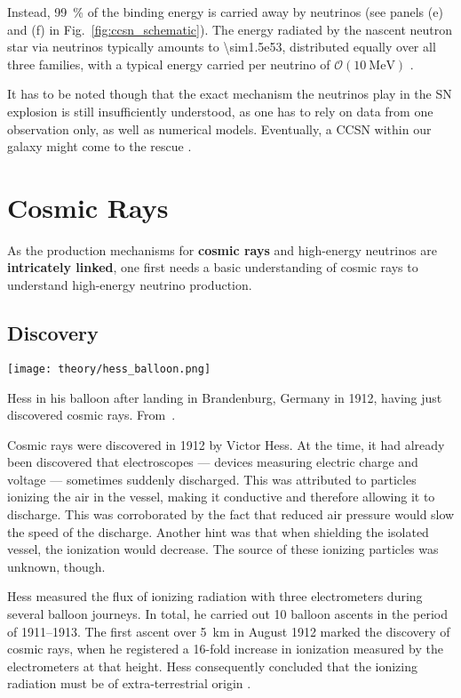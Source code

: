 Instead, \SI{99}{\percent} of the binding energy is carried away by neutrinos (see panels (e) and (f) in Fig.~\ref{fig:ccsn_schematic}). The energy radiated by the nascent neutron star via neutrinos typically amounts to \SI{\sim1.5e53}{\erg}, distributed equally over all three families, with a typical energy carried per neutrino of $\mathcal{O}(\SI{10}{\mega\eV})$ .

It has to be noted though that the exact mechanism the neutrinos play in the SN explosion is still insufficiently understood, as one has to rely on data from one observation only, as well as numerical models. Eventually, a CCSN within our galaxy might come to the rescue .

\section{Cosmic Rays}\label{cosmic_rays}

As the production mechanisms for \textbf{cosmic rays} and high-energy neutrinos are \textbf{intricately linked}, one first needs a basic understanding of cosmic rays to understand high-energy neutrino production.

\subsection{Discovery}

\begin{marginfigure}
    \texttt{[image: theory/hess\_balloon.png]}
    \caption[Hess in his balloon]{Hess in his balloon after landing in Brandenburg, Germany in 1912, having just discovered cosmic rays. From~\cite{Steinmaurer1985}.}
\end{marginfigure}

Cosmic rays were discovered in 1912 by Victor Hess. At the time, it had already been discovered that electroscopes --- devices measuring electric charge and voltage --- sometimes suddenly discharged. This was attributed to particles ionizing the air in the vessel, making it conductive and therefore allowing it to discharge. This was corroborated by the fact that reduced air pressure would slow the speed of the discharge. Another hint was that when shielding the isolated vessel, the ionization would decrease. The source of these ionizing particles was unknown, though.

Hess measured the flux of ionizing radiation with three electrometers during several balloon journeys. In total, he carried out 10 balloon ascents in the period of 1911--1913. The first ascent over \SI{5}{\km} in August 1912 marked the discovery of cosmic rays, when he registered a 16-fold increase in ionization measured by the electrometers at that height. Hess consequently concluded that the ionizing radiation must be of extra-terrestrial origin .

